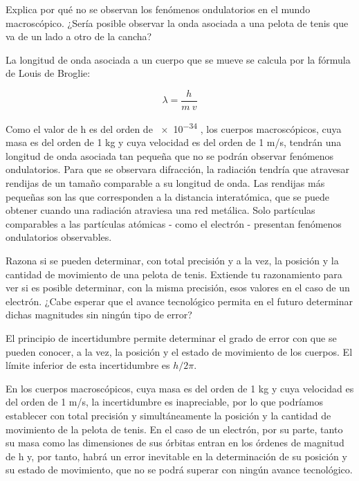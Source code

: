 \begin{question}
    Explica por qué no se observan los fenómenos ondulatorios en el mundo macroscópico.
    ¿Sería posible observar la onda asociada a una pelota de tenis que va de un
    lado a otro de la cancha?

    \begin{solu}
        La longitud de onda asociada a un cuerpo que se mueve se calcula por la fórmula de Louis de Broglie:

        \begin{equation*}
            \lambda = \dfrac{h}{m\ v}
        \end{equation*}

        Como el valor de h es del orden de \num{e-34} , los cuerpos macroscópicos,
        cuya masa es del orden de 1 kg y cuya velocidad
        es del orden de 1 m/s, tendrán una longitud de onda asociada
        tan pequeña que no se podrán observar fenómenos
        ondulatorios. Para que se observara difracción, la radiación
        tendría que atravesar rendijas de un tamaño comparable a
        su longitud de onda. Las rendijas más pequeñas son las
        que corresponden a la distancia interatómica, que se puede
        obtener cuando una radiación atraviesa una red metálica.
        Solo partículas comparables a las partículas atómicas - como
        el electrón - presentan fenómenos ondulatorios observables.
    \end{solu}

\end{question}

\begin{question}
    Razona si se pueden determinar, con total precisión y a la vez, la posición y la cantidad de movimiento de una pelota de tenis. Extiende tu razonamiento para ver si es posible determinar, con la misma precisión, esos valores
    en el caso de un electrón. ¿Cabe esperar que el avance tecnológico permita en el futuro determinar dichas magnitudes sin ningún tipo de error?

    \begin{solu}
        El principio de incertidumbre permite determinar el grado de error con que se pueden conocer, a la vez, la posición y el estado de movimiento de los cuerpos. El límite inferior de esta incertidumbre es \(h/2\pi\).

        En los cuerpos macroscópicos, cuya masa es del orden de 1 kg y cuya velocidad es del orden de 1 m/s, la incertidumbre es inapreciable, por lo que podríamos establecer con total precisión y simultáneamente la posición y la cantidad de movimiento de la pelota de tenis.
        En el caso de un electrón, por su parte, tanto su masa como las dimensiones de sus
        órbitas entran en los órdenes de magnitud de h y, por tanto, habrá un error inevitable en la determinación de su posición y su estado de movimiento, que no se podrá superar con
        ningún avance tecnológico.
    \end{solu}
\end{question}

